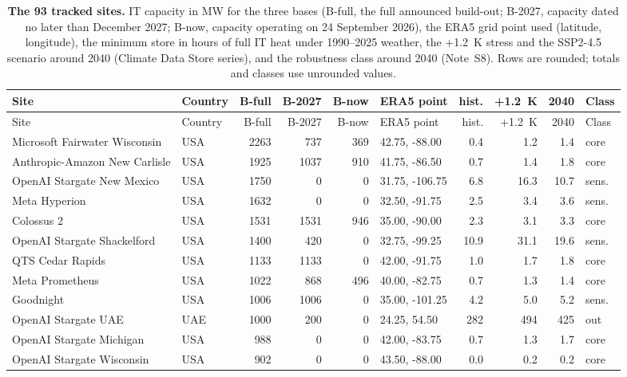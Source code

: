 \begin{footnotesize}
\setlength{\tabcolsep}{3.2pt}
\begin{longtable}{@{}p{46mm}lrrrlrrrl@{}}
\caption{\textbf{The 93 tracked sites.} IT capacity in MW for the three bases (B-full, the full announced build-out; B-2027, capacity dated no later than December 2027; B-now, capacity operating on 24 September 2026), the ERA5 grid point used (latitude, longitude), the minimum store \hstar{} in hours of full IT heat under 1990--2025 weather, the +1.2~K stress and the SSP2-4.5 scenario around 2040 (Climate Data Store series), and the robustness class around 2040 (Note~S8). Rows are rounded; totals and classes use unrounded values.}\label{tab:s1}\\
\toprule
Site & Country & B-full & B-2027 & B-now & ERA5 point & \hstar{} hist. & \hstar{} +1.2~K & \hstar{} 2040 & Class\\
\midrule
\endfirsthead
\toprule
Site & Country & B-full & B-2027 & B-now & ERA5 point & \hstar{} hist. & \hstar{} +1.2~K & \hstar{} 2040 & Class\\
\midrule
\endhead
Microsoft Fairwater Wisconsin & USA & 2263 & 737 & 369 & 42.75, -88.00 & 0.4 & 1.2 & 1.4 & core \\
Anthropic-Amazon New Carlisle & USA & 1925 & 1037 & 910 & 41.75, -86.50 & 0.7 & 1.4 & 1.8 & core \\
OpenAI Stargate New Mexico & USA & 1750 & 0 & 0 & 31.75, -106.75 & 6.8 & 16.3 & 10.7 & sens. \\
Meta Hyperion & USA & 1632 & 0 & 0 & 32.50, -91.75 & 2.5 & 3.4 & 3.6 & sens. \\
Colossus 2 & USA & 1531 & 1531 & 946 & 35.00, -90.00 & 2.3 & 3.1 & 3.3 & core \\
OpenAI Stargate Shackelford & USA & 1400 & 420 & 0 & 32.75, -99.25 & 10.9 & 31.1 & 19.6 & sens. \\
QTS Cedar Rapids & USA & 1133 & 1133 & 0 & 42.00, -91.75 & 1.0 & 1.7 & 1.8 & core \\
Meta Prometheus & USA & 1022 & 868 & 496 & 40.00, -82.75 & 0.7 & 1.3 & 1.4 & core \\
Goodnight & USA & 1006 & 1006 & 0 & 35.00, -101.25 & 4.2 & 5.0 & 5.2 & sens. \\
OpenAI Stargate UAE & UAE & 1000 & 200 & 0 & 24.25, 54.50 & 282 & 494 & 425 & out \\
OpenAI Stargate Michigan & USA & 988 & 0 & 0 & 42.00, -83.75 & 0.7 & 1.3 & 1.7 & core \\
OpenAI Stargate Wisconsin & USA & 902 & 0 & 0 & 43.50, -88.00 & 0.0 & 0.2 & 0.2 & core \\

\end{longtable}
\end{footnotesize}
